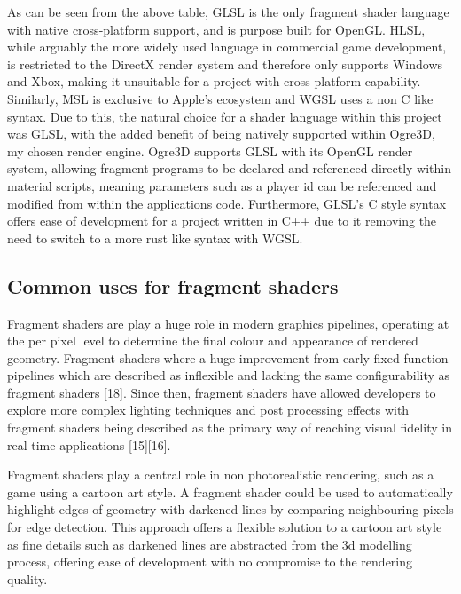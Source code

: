 \documentclass[]{final_report}
\begin{document}
As can be seen from the above table, GLSL is the only fragment shader language with native cross-platform support, and is purpose built for OpenGL. HLSL, while arguably the more widely used language in commercial game development, is restricted to the DirectX render system and therefore only supports Windows and Xbox, making it unsuitable for a project with cross platform capability. Similarly, MSL is exclusive to Apple's ecosystem and WGSL uses a non C like syntax. Due to this, the natural choice for a shader language within this project was GLSL, with the added benefit of being natively supported within Ogre3D, my chosen render engine. Ogre3D supports GLSL with its OpenGL render system, allowing fragment programs to be declared and referenced directly within material scripts, meaning parameters such as a player id can be referenced and modified from within the applications code. Furthermore, GLSL's C style syntax offers ease of development for a project written in C++ due to it removing the need to switch to a more rust like syntax with WGSL.

\subsection {Common uses for fragment shaders}

Fragment shaders are play a huge role in modern graphics pipelines, operating at the per pixel level to determine the final colour and appearance of rendered geometry. Fragment shaders where a huge improvement from early fixed-function pipelines which are described as inflexible and lacking the same configurability as fragment shaders [18]. Since then, fragment shaders have allowed developers to explore more complex lighting techniques and post processing effects with fragment shaders being described as the primary way of reaching visual fidelity in real time applications [15][16].

Fragment shaders play a central role in non photorealistic rendering, such as a game using a cartoon art style. A fragment shader could be used to automatically highlight edges of geometry with darkened lines by comparing neighbouring pixels for edge detection. This approach offers a flexible solution to a cartoon art style as fine details such as darkened lines are abstracted from the 3d modelling process, offering ease of development with no compromise to the rendering quality. 
\end{document}
